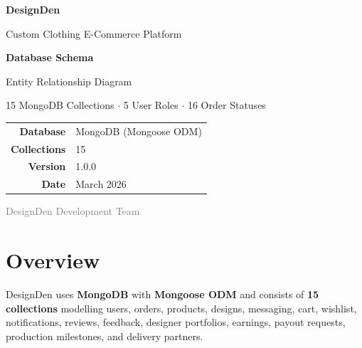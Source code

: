\documentclass[a4paper,11pt]{article}
\begin{document}
\begin{titlepage}
  \centering
  \vspace*{2cm}
  {\Huge\bfseries\textcolor{primary}{DesignDen}\par}
  \vspace{0.4cm}
  {\large\textcolor{secondary}{Custom Clothing E-Commerce Platform}\par}
  \vspace{1.5cm}
  \begin{mdframed}[linecolor=primary,linewidth=2pt,innertopmargin=16pt,innerbottommargin=16pt]
    \centering
    {\LARGE\bfseries Database Schema}\par
    \vspace{0.3cm}
    {\normalsize Entity Relationship Diagram}\par
    \vspace{0.3cm}
    {\small 15 MongoDB Collections $\cdot$ 5 User Roles $\cdot$ 16 Order Statuses}
  \end{mdframed}
  \vspace{2cm}
  \begin{tabular}{rl}
    \textbf{Database}   & MongoDB (Mongoose ODM)        \\[4pt]
    \textbf{Collections}& 15                            \\[4pt]
    \textbf{Version}    & 1.0.0                         \\[4pt]
    \textbf{Date}       & March 2026                    \\
  \end{tabular}
  \vfill
  {\small\textcolor{gray}{DesignDen Development Team}}
\end{titlepage}

\tableofcontents
\newpage

\section{Overview}

DesignDen uses \textbf{MongoDB} with \textbf{Mongoose ODM} and consists of \textbf{15 collections}
modelling users, orders, products, designs, messaging, cart, wishlist, notifications,
reviews, feedback, designer portfolios, earnings, payout requests, production milestones,
and delivery partners.
\end{document}
